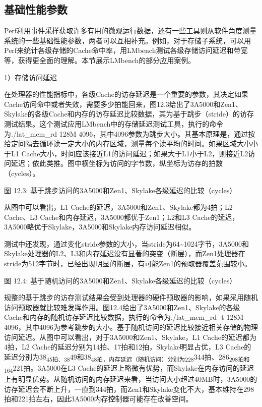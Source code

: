 \documentclass[]{ctexbook}
\begin{document}
\hypertarget{ux57faux7840ux6027ux80fdux53c2ux6570}{%
\subsection{基础性能参数}\label{ux57faux7840ux6027ux80fdux53c2ux6570}}

Perf利用事件采样获取许多有用的微观运行数据，还有一些工具则从软件角度测量系统的一些基础性能参数，两者可以互相补充。例如，对于存储子系统，可以用Perf来统计各级存储的Cache命中率，用LMbench测试各级存储访问延迟和带宽等，获得更全面的理解。本节展示LMbench的部分应用案例。

1）存储访问延迟

在处理器的性能指标中，各级Cache的访存延迟是一个重要的参数，其决定如果Cache访问命中或者失效，需要多少拍能回来，图12.3给出了3A5000和Zen1、Skylake的各级Cache和内存的访存延迟比较数据，其为基于跳步（stride）的访存测试结果。这个测试应用LMbench中的存储延迟测试工具，执行的命令为./lat\_mem\_rd 128M 4096，其中4096参数为跳步大小。其基本原理是，通过按给定间隔去循环读一定大小的内存区域，测量每个读平均的时间。如果区域大小小于L1 Cache大小，时间应该接近L1的访问延迟；如果大于L1小于L2，则接近L2访问延迟；依此类推。图中横坐标为访问的字节数，纵坐标为访存的拍数（cycles）。

图 12.3: 基于跳步访问的3A5000和Zen1、Skylake各级延迟的比较（cycles）

从图中可以看出，L1 Cache的延迟，3A5000和Zen1、Skylake都为4拍；L2 Cache、L3 Cache和内存延迟，3A5000都优于Zen1；L2和L3 Cache的延迟，3A5000略优于Skylake，3A5000和Skylake内存访问延迟相似。

测试中还发现，通过变化stride参数的大小，当stride为64\textasciitilde1024字节，3A5000和Skylake处理器的L2、L3和内存延迟没有显著的突变（断层），而Zen1处理器在stride为512字节时，已经出现明显的断层，有可能Zen1的预取器覆盖范围较小。

图 12.4: 基于随机访问的3A5000和Zen1、Skylake各级延迟的比较（cycles）

规整的基于跳步的访存测试结果会受到处理器的硬件预取器的影响，如果采用随机访问预取器就比较难发挥作用。图12.4给出了3A5000和Zen1、Skylake的各级Cache和内存的随机访存延迟比较数据，执行的命令为./lat\_mem\_rd -t 128M 4096，其中4096为参考跳步的大小。基于随机访问的延迟比较接近相关存储的物理访问延迟。从图中可以看出，对于3A5000和Zen1、Skylake，L1 Cache的延迟都为4拍，L2 Cache的延迟分别为14拍、17拍和12拍，Skylake明显占优，L3 Cache的延迟分别为38\textsubscript{45拍、38}49和38\textsubscript{48拍，内存延迟（随机访问）分别为228}344拍、286\textsubscript{298拍和164}221拍。3A5000在L3 Cache的延迟上略微有优势，而Skylake在内存访问的延迟上有明显优势。从随机访问的内存延迟来看，当访问大小超过40MB时，3A5000的访存延迟会不断上升，一直到344拍，而Zen1和Skylake变化不大，基本维持在298拍和221拍左右，因此3A5000内存控制器可能存在改善空间。
\end{document}
